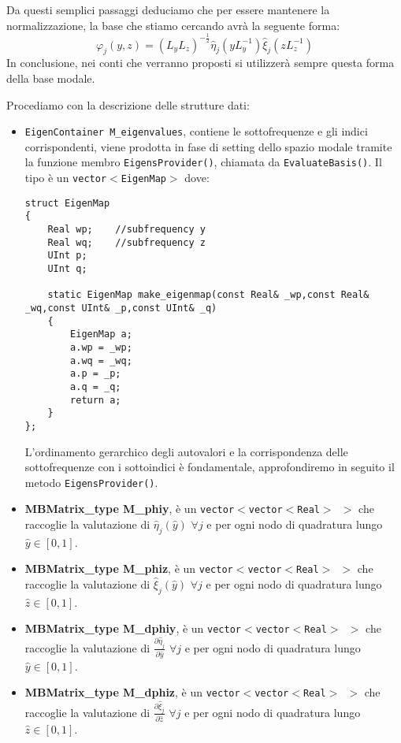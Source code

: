 Da questi semplici passaggi deduciamo che per essere mantenere la normalizzazione, la base che stiamo cercando avr\`a la seguente forma:
\begin{equation}
\label{eq: base sul dominio corrente}
\varphi_j(y,z) = (L_yL_z)^{-\frac{1}{2}}\hat{\eta}_j(yL_y^{-1})\hat{\xi}_j(zL_z^{-1})
\end{equation}
In conclusione, nei conti che verranno proposti si utilizzer\`a sempre questa forma della base modale.

Procediamo con la descrizione delle strutture dati:

\begin{itemize}

\item \texttt{EigenContainer M\_eigenvalues}, contiene le sottofrequenze e gli indici corrispondenti, viene prodotta in fase di setting dello spazio modale tramite la funzione membro \texttt{EigensProvider()}, chiamata da \texttt{EvaluateBasis()}. Il tipo \`e un \texttt{vector$<$EigenMap$>$} dove:
 
\begin{lstlisting}[style = general]
struct EigenMap
{
	Real wp;	//subfrequency y
	Real wq;	//subfrequency z
	UInt p;
	UInt q;
	
	static EigenMap make_eigenmap(const Real& _wp,const Real& _wq,const UInt& _p,const UInt& _q)
	{
		EigenMap a;
		a.wp = _wp;
		a.wq = _wq;
		a.p = _p;
		a.q = _q;
		return a;	
	}
};
\end{lstlisting}
L'ordinamento gerarchico degli autovalori e la corrispondenza delle sottofrequenze con i sottoindici \`e fondamentale, approfondiremo in seguito il metodo \texttt{EigensProvider()}.

\item \textbf{MBMatrix\_type M\_phiy}, \`e un \texttt{vector$<$vector$<$Real$>$ $>$} che raccoglie la valutazione di $\hat{\eta}_j(\hat{y})$ $\forall j$ e per ogni nodo di quadratura lungo $\hat{y}\in[0,1]$.

\item \textbf{MBMatrix\_type M\_phiz}, \`e un \texttt{vector$<$vector$<$Real$>$ $>$} che raccoglie la valutazione di $\hat{\xi}_j(\hat{y})$ $\forall j$ e per ogni nodo di quadratura lungo $\hat{z}\in[0,1]$.

\item \textbf{MBMatrix\_type M\_dphiy}, \`e un \texttt{vector$<$vector$<$Real$>$ $>$} che raccoglie la valutazione di $\frac{\partial\hat{\eta}_j}{\partial 	\hat{y}}$ $\forall j$ e per ogni nodo di quadratura lungo $\hat{y}\in[0,1]$.

\item \textbf{MBMatrix\_type M\_dphiz}, \`e un \texttt{vector$<$vector$<$Real$>$ $>$} che raccoglie la valutazione di $\frac{\partial\hat{\xi}_j}{\partial 	\hat{z}}$ $\forall j$ e per ogni nodo di quadratura lungo $\hat{z}\in[0,1]$.

\end{itemize}


